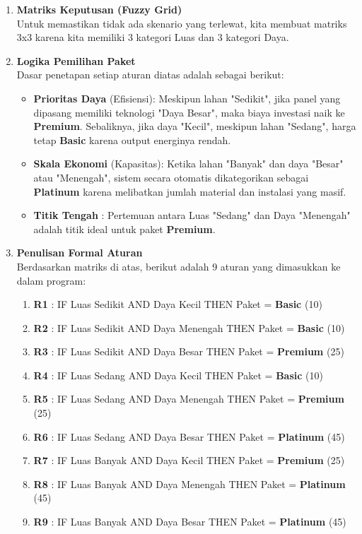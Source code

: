 \documentclass{article}
\begin{document}
\begin{enumerate}
    \item \textbf{Matriks Keputusan (Fuzzy Grid)}\\
    Untuk memastikan tidak ada skenario yang terlewat, kita membuat matriks 3x3 karena kita memiliki 3 kategori Luas dan 3 kategori Daya.

    \item \textbf{Logika Pemilihan Paket}\\
Dasar penetapan setiap aturan diatas adalah sebagai berikut:
    \begin{itemize}
        \item \textbf{Prioritas Daya} (Efisiensi): Meskipun lahan "Sedikit", jika panel yang dipasang memiliki teknologi "Daya Besar", maka biaya investasi naik ke \textbf{Premium}. Sebaliknya, jika daya "Kecil", meskipun lahan "Sedang", harga tetap \textbf{Basic} karena output energinya rendah.
        \item \textbf{Skala Ekonomi} (Kapasitas): Ketika lahan "Banyak" dan daya "Besar" atau "Menengah", sistem secara otomatis dikategorikan sebagai \textbf{Platinum} karena melibatkan jumlah material dan instalasi yang masif.
        \item \textbf{Titik Tengah} : Pertemuan antara Luas "Sedang" dan Daya "Menengah" adalah titik ideal untuk paket \textbf{Premium}.
    \end{itemize}

    \item \textbf{Penulisan Formal Aturan}\\
Berdasarkan matriks di atas, berikut adalah 9 aturan yang dimasukkan ke dalam program:
    \begin{enumerate}
        \item \textbf{R1} : IF Luas Sedikit AND Daya Kecil THEN Paket = \textbf{Basic} (10)
        \item \textbf{R2} : IF Luas Sedikit AND Daya Menengah THEN Paket = \textbf{Basic} (10)
        \item \textbf{R3} : IF Luas Sedikit AND Daya Besar THEN Paket = \textbf{Premium} (25)
        \item \textbf{R4} : IF Luas Sedang AND Daya Kecil THEN Paket = \textbf{Basic} (10)
        \item \textbf{R5} : IF Luas Sedang AND Daya Menengah THEN Paket = \textbf{Premium} (25)
        \item \textbf{R6} : IF Luas Sedang AND Daya Besar THEN Paket = \textbf{Platinum} (45)
        \item \textbf{R7} : IF Luas Banyak AND Daya Kecil THEN Paket = \textbf{Premium} (25)
        \item \textbf{R8} : IF Luas Banyak AND Daya Menengah THEN Paket = \textbf{Platinum} (45)
        \item \textbf{R9} : IF Luas Banyak AND Daya Besar THEN Paket = \textbf{Platinum} (45)
    \end{enumerate}


\end{enumerate}
\end{document}
